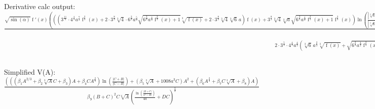 \documentclass[11pt]{article}
\begin{document}
Derivative calc output:
$
\frac{\sqrt{\sin\left({\alpha}\right)} \operatorname{f}'\left(x\right) \left(\left(\left(3^{\frac{11}{3}} \cdot 4^{\frac{4}{3}} a^{\frac{7}{3}} \operatorname{f}^{\frac{2}{3}}\left(x\right) + 2 \cdot 3^{\frac{8}{3}} \sqrt[3]{4} \cdot 6^{\frac{2}{3}} a^{\frac{5}{3}} \sqrt{6^{\frac{2}{3}} a^{\frac{4}{3}} \operatorname{f}^{\frac{2}{3}}\left(x\right) + 1} \sqrt[3]{\operatorname{f}\left(x\right)} + 2 \cdot 3^{\frac{8}{3}} \sqrt[3]{4} \sqrt[3]{6} \, a\right) \operatorname{f}\left(x\right) + 3^{\frac{8}{3}} \sqrt[3]{4} \sqrt[3]{a} \sqrt{6^{\frac{2}{3}} a^{\frac{4}{3}} \operatorname{f}^{\frac{2}{3}}\left(x\right) + 1} \operatorname{f}^{\frac{2}{3}}\left(x\right)\right) \ln\left(\frac{\left|\sqrt[3]{6} \, a^{\frac{2}{3}} \sqrt[3]{\operatorname{f}\left(x\right)} + \sqrt{6^{\frac{2}{3}} a^{\frac{4}{3}} \operatorname{f}^{\frac{2}{3}}\left(x\right) + 1}\right|}{\left|\sqrt[3]{6} \, a^{\frac{2}{3}} \sqrt[3]{\operatorname{f}\left(x\right)} - \sqrt{6^{\frac{2}{3}} a^{\frac{4}{3}} \operatorname{f}^{\frac{2}{3}}\left(x\right) + 1}\right|}\right) + \left(28 \cdot 6^{\frac{7}{3}} a^{\frac{11}{3}} \sqrt[3]{\operatorname{f}\left(x\right)} + 1008a^{3} \sqrt{6^{\frac{2}{3}} a^{\frac{4}{3}} \operatorname{f}^{\frac{2}{3}}\left(x\right) + 1}\right) \operatorname{f}^{2}\left(x\right) + \left(\left(46 \cdot 6^{\frac{5}{3}} - 2 \cdot 3^{\frac{5}{3}} \cdot 4^{\frac{4}{3}}\right) a^{\frac{7}{3}} \operatorname{f}^{\frac{2}{3}}\left(x\right) + \left(32 \cdot 6^{\frac{4}{3}} - 3^{\frac{2}{3}} \cdot 4^{\frac{4}{3}} \cdot 6^{\frac{2}{3}}\right) a^{\frac{5}{3}} \sqrt{6^{\frac{2}{3}} a^{\frac{4}{3}} \operatorname{f}^{\frac{2}{3}}\left(x\right) + 1} \sqrt[3]{\operatorname{f}\left(x\right)} + \left(96 - 2 \cdot 3^{\frac{2}{3}} \sqrt[3]{4} \sqrt[3]{6}\right) a\right) \operatorname{f}\left(x\right)\right)}{2 \cdot 3^{\frac{5}{3}} \cdot 4^{\frac{4}{3}} a^{\frac{4}{3}} \left(\sqrt[3]{6} \, a^{\frac{2}{3}} \sqrt[3]{\operatorname{f}\left(x\right)} + \sqrt{6^{\frac{2}{3}} a^{\frac{4}{3}} \operatorname{f}^{\frac{2}{3}}\left(x\right) + 1}\right)^{2} \sqrt{6^{\frac{2}{3}} a^{\frac{4}{3}} \operatorname{f}^{\frac{2}{3}}\left(x\right) + 1} \sqrt[6]{\operatorname{f}\left(x\right)} \left(\frac{\ln\left(\frac{\left|\sqrt[3]{6} \, a^{\frac{2}{3}} \sqrt[3]{\operatorname{f}\left(x\right)} + \sqrt{6^{\frac{2}{3}} a^{\frac{4}{3}} \operatorname{f}^{\frac{2}{3}}\left(x\right) + 1}\right|}{\left|\sqrt[3]{6} \, a^{\frac{2}{3}} \sqrt[3]{\operatorname{f}\left(x\right)} - \sqrt{6^{\frac{2}{3}} a^{\frac{4}{3}} \operatorname{f}^{\frac{2}{3}}\left(x\right) + 1}\right|}\right)}{4a} + \frac{\sqrt[3]{3} \sqrt{6^{\frac{2}{3}} a^{\frac{4}{3}} \operatorname{f}^{\frac{2}{3}}\left(x\right) + 1} \sqrt[3]{\operatorname{f}\left(x\right)}}{\sqrt[3]{4} \sqrt[3]{a}}\right)^{\frac{3}{2}}}
$

Simplified V(A):
$
\frac{\left(\left(\left( \beta_1 A^{2/3} + \beta_2 \sqrt[3]{A}  C + \beta_3\right) A + \beta_4 C A^{\frac{2}{3}} \right) \ln\left(\frac{\left|C+B\right|}{\left|C-B\right|}\right) + \left(\beta_5 \sqrt[3]{A} + 1008a^{3} C\right) A^{2} + \left(\beta_6 A^{\frac{2}{3}} + \beta_7 C \sqrt[3]{A} + \beta_8\right) A\right)}{\beta_9 \left(B+C\right)^{2} C \sqrt[6]{A} \left(\frac{\ln\left(\frac{\left|B+C\right|}{\left|C-B\right|}\right)}{4a} + DC\right)^{\frac{3}{2}}}
$
\end{document}
